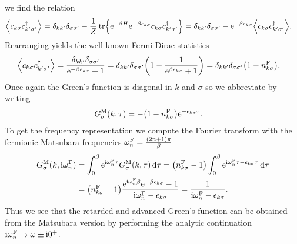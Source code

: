 \documentclass[english, parskip=full]{scrartcl}
\begin{document}
we find the relation
\begin{align}
\bra*{c_{k\sigma} c_{k'\sigma'}^\dagger} &= \delta_{kk'} \delta_{\sigma\sigma'} - \frac{1}{Z} \tr\klc*{\powe{-\beta H} \powe{-\beta\epsilon_{k\sigma}} c_{k\sigma} c_{k'\sigma'}^\dagger} = \delta_{kk'} \delta_{\sigma\sigma'} - \powe{-\beta\epsilon_{k\sigma}} \bra*{c_{k\sigma} c_{k'\sigma'}^\dagger}.
\end{align}
Rearranging yields the well-known Fermi-Dirac statistics
\begin{align}
\bra*{c_{k\sigma} c_{k'\sigma'}^\dagger} &= \frac{\delta_{kk'} \delta_{\sigma\sigma'}}{\powe{-\beta\epsilon_{k\sigma}} + 1} = \delta_{kk'} \delta_{\sigma\sigma'} \kla*{1 - \frac{1}{\powe{\beta \epsilon_{k\sigma}} + 1}} = \delta_{kk'} \delta_{\sigma\sigma'} \kla*{1 - n^\F_{k\sigma}}.
\end{align}
Once again the Green's function is diagonal in $k$ and $\sigma$ so we abbreviate by writing
\begin{align}
G^\M_\sigma(k,\tau) &= -\kla*{1 - n_{k\sigma}^\F} \powe{-\epsilon_{k\sigma} \tau}.
\end{align}
To get the frequency representation we compute the Fourier transform with the fermionic Matsubara frequencies $\omega_n^{\text{F}} = \frac{(2n+1)\pi}{\beta}$
\begin{align}
G^\M_\sigma(k,\i\omega_n^\F) &= \intx{0}{\beta}{\powe{\i\omega_n^\F \tau} G^\M_\sigma(k,\tau)}{\tau} = \kla*{n^\F_{k\sigma} - 1}\intx{0}{\beta}{\powe{\i\omega_n^\F \tau - \epsilon_{k\sigma} \tau}}{\tau} \\
&= \kla*{n^\F_{k\sigma} - 1} \frac{\powe{\i\omega_n^\F \beta} \powe{-\beta \epsilon_{k\sigma}} - 1}{\i\omega_n^\F - \epsilon_{k\sigma}} = \frac{1}{\i\omega_n^\F - \epsilon_{k\sigma}}.
\end{align}
Thus we see that the retarded and advanced Green's function can be obtained from the Matsubara version by performing the analytic continuation $\text{i}\omega_n^{\text{F}} \rightarrow \omega \pm \text{i} 0^+$.
\end{document}
